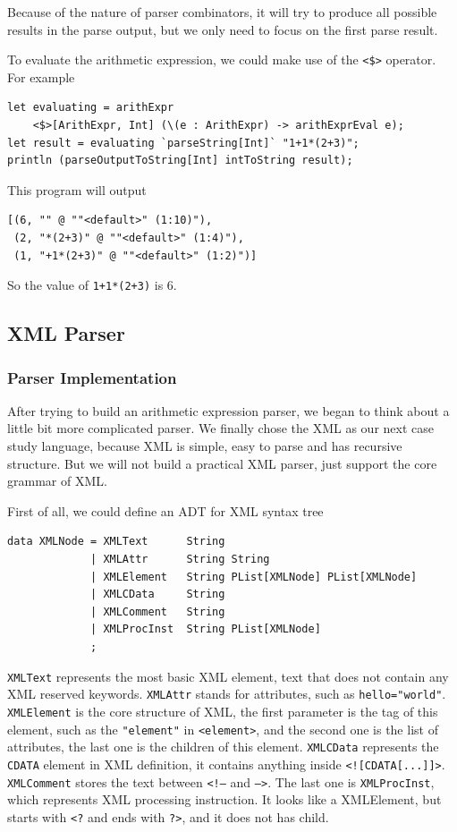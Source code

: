Because of the nature of parser combinators, it will try to produce all possible results in the parse output, but we only need to focus on the first parse result.

To evaluate the arithmetic expression, we could make use of the \texttt{<\$>} operator. For example

\begin{lstlisting}
let evaluating = arithExpr
    <$>[ArithExpr, Int] (\(e : ArithExpr) -> arithExprEval e);
let result = evaluating `parseString[Int]` "1+1*(2+3)";
println (parseOutputToString[Int] intToString result);
\end{lstlisting}

This program will output

\begin{lstlisting}
[(6, "" @ ""<default>" (1:10)"),
 (2, "*(2+3)" @ ""<default>" (1:4)"),
 (1, "+1*(2+3)" @ ""<default>" (1:2)")]
\end{lstlisting}

So the value of \texttt{1+1*(2+3)} is 6.

\subsection{XML Parser} \label{section:xml_parser}

\subsubsection{Parser Implementation}

After trying to build an arithmetic expression parser, we began to think about a little bit more complicated parser. We finally chose the XML as our next case study language, because XML is simple, easy to parse and has recursive structure. But we will not build a practical XML parser, just support the core grammar of XML.

First of all, we could define an ADT for XML syntax tree

\begin{lstlisting}
data XMLNode = XMLText      String
             | XMLAttr      String String
             | XMLElement   String PList[XMLNode] PList[XMLNode]
             | XMLCData     String
             | XMLComment   String
             | XMLProcInst  String PList[XMLNode]
             ;
\end{lstlisting}

\texttt{XMLText} represents the most basic XML element, text that does not contain any XML reserved keywords. \texttt{XMLAttr} stands for attributes, such as \texttt{hello="world"}. \texttt{XMLElement} is the core structure of XML, the first parameter is the tag of this element, such as the \texttt{"element"} in \texttt{<element>}, and the second one is the list of attributes, the last one is the children of this element. \texttt{XMLCData} represents the \texttt{CDATA} element in XML definition, it contains anything inside \texttt{<![CDATA[...]]>}. \texttt{XMLComment} stores the text between \texttt{<!--} and \texttt{-->}. The last one is \texttt{XMLProcInst}, which represents XML processing instruction. It looks like a XMLElement, but starts with \texttt{<?} and ends with \texttt{?>}, and it does not has child.

